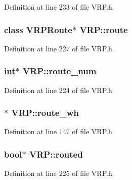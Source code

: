 Definition at line 233 of file VRP.h.

\hypertarget{class_v_r_p_a031f5b20e9fcbcb5f79839444ce0bbfc}{
\subsubsection[{route}]{\setlength{\rightskip}{0pt plus 5cm}class {\bf VRPRoute}$\ast$ {\bf VRP::route}}}
\label{class_v_r_p_a031f5b20e9fcbcb5f79839444ce0bbfc}


Definition at line 227 of file VRP.h.

\hypertarget{class_v_r_p_aaf42240b29e2ddf0c79b3da8cd6a3087}{
\subsubsection[{route\_\-num}]{\setlength{\rightskip}{0pt plus 5cm}int$\ast$ {\bf VRP::route\_\-num}}}
\label{class_v_r_p_aaf42240b29e2ddf0c79b3da8cd6a3087}


Definition at line 224 of file VRP.h.

\hypertarget{class_v_r_p_a57c6657f57f74ec450a59d277706dfd6}{
\subsubsection[{route\_\-wh}]{$\ast$ {\bf VRP::route\_\-wh}}}
\label{class_v_r_p_a57c6657f57f74ec450a59d277706dfd6}


Definition at line 147 of file VRP.h.

\hypertarget{class_v_r_p_a49559f4098eea0527da72878fb5d5404}{
\subsubsection[{routed}]{\setlength{\rightskip}{0pt plus 5cm}bool$\ast$ {\bf VRP::routed}}}
\label{class_v_r_p_a49559f4098eea0527da72878fb5d5404}


Definition at line 225 of file VRP.h.

